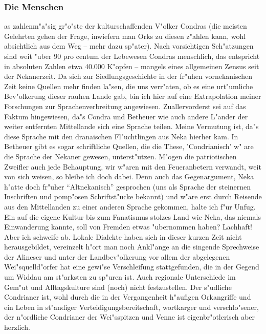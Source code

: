 \documentclass[a5paper,8pt]{book}
\begin{document}
\newpage

\subsubsection{ Die Menschen}

as zahlenm"a"sig gr"o"ste der kulturschaffenden V"olker Condras (die meisten Gelehrten gehen der Frage, inwiefern man Orks zu diesen z"ahlen kann, wohl absichtlich aus dem Weg – mehr dazu sp"ater). Nach vorsichtigen Sch"atzungen sind weit "uber 90 pro centum der Lebewesen Condras menschlich, das entspricht in absoluten Zahlen etwa 40.000 K"opfen – mangels eines allgemeinen Zensus seit der Nekanerzeit. Da sich zur Siedlungsgeschichte in der fr"uhen vornekanischen Zeit keine Quellen mehr finden la"sen, die uns verr"aten, ob es eine urt"umliche Bev"olkerung dieser rauhen Lande gab, bin ich hier auf eine Extrapolation meiner Forschungen zur Sprachenverbreitung angewiesen. Zuallervorderst sei auf das Faktum hingewiesen, da"s Condra und Betheuer wie auch andere L"ander der weiter entfernten Mittellande sich eine Sprache teilen. Meine Vermutung ist, da"s diese Sprache mit den dranaischen Fl"uchtlingen aus Neka hierher kam. In Betheuer gibt es sogar schriftliche Quellen, die die These, 'Condrianisch' w"
are die Sprache der Nekaner gewesen, unterst"utzen. M"ogen die patriotischen Zweifler auch jede Behauptung, wir w"aren mit den Feueranbetern verwandt, weit von sich weisen, so bleibe ich doch dabei. Denn auch das Gegenargument, Neka h"atte doch fr"uher “Altnekanisch” gesprochen (uns als Sprache der steinernen Inschriften und pomp"osen Schriftst"ucke bekannt) und w"are erst durch Reisende aus den Mittellanden zu einer anderen Sprache gekommen, halte ich f"ur Unfug. Ein auf die eigene Kultur bis zum Fanatismus stolzes Land wie Neka, das niemals Einwanderung kannte, soll von Fremden etwas "ubernommen haben? Lachhaft! Aber ich schweife ab.
Lokale Dialekte haben sich in dieser kurzen Zeit nicht herausgebildet, vereinzelt h"ort man noch Ankl"ange an die singende Sprechweise der Alineser und unter der Landbev"olkerung vor allem der abgelegenen Wei"squelld"orfer hat eine gewi"se Verschleifung stattgefunden, die in der Gegend um Widdau am st"arksten zu sp"uren ist. Auch regionale Unterschiede im Gem"ut und Alltagskulture sind (noch) nicht festzustellen. Der s"udliche Condrianer ist, wohl durch die in der Vergangenheit h"aufigen Orkangriffe und ein Leben in st"andiger Verteidigungsbereitschaft, wortkarger und verschlo"sener, der n"ordliche Condrianer der Wei"sspitzen und Venne ist eigenbr"otlerisch aber herzlich.
\end{document}
